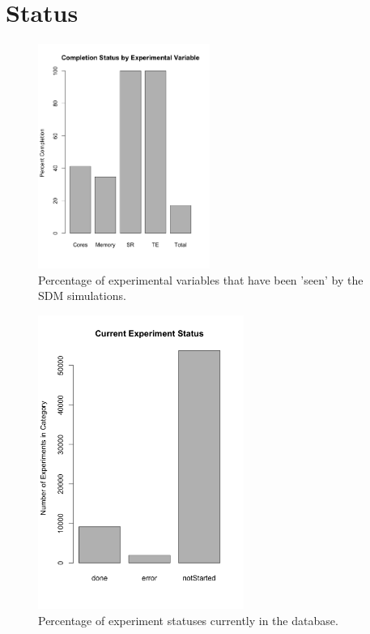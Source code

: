 \documentclass[a4paper]{article}
\begin{document}
\section{Status}

\begin{figure}
\centering
\includegraphics[width=0.5\textwidth]{CompletionByType.png}
\caption{\label{fig:experimentByCategory}Percentage of experimental variables that have been 'seen' by the SDM simulations.}
\end{figure}

\begin{figure}
\centering
\includegraphics[width=0.6\textwidth]{experimentByCategory.png}
\caption{\label{fig:completionByCategory}Percentage of experiment statuses currently in the database. }
\end{figure}
\end{document}
